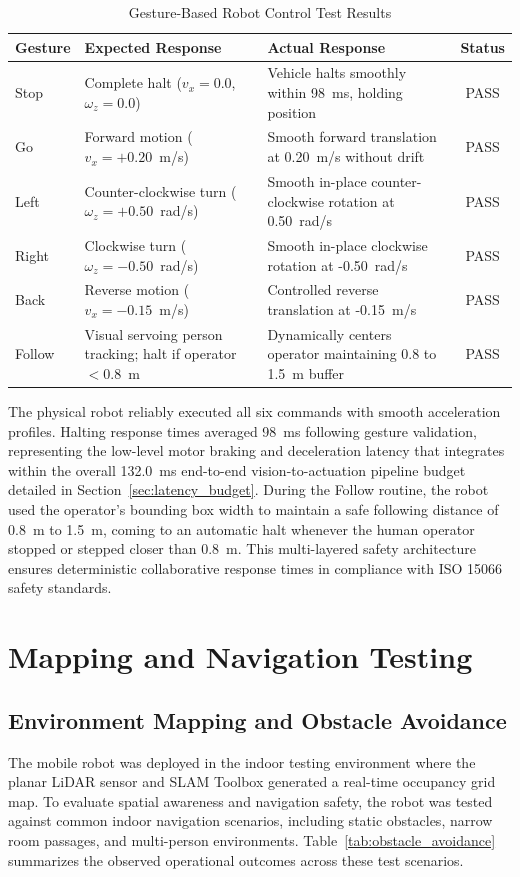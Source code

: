 \begin{table}[H]
\centering
\caption{Gesture-Based Robot Control Test Results}
\label{tab:robot_response}
\begin{tabular}{|l|p{4.2cm}|p{5.2cm}|c|}
\hline
\textbf{Gesture} & \textbf{Expected Response} & \textbf{Actual Response} & \textbf{Status} \\
\hline
Stop & Complete halt ($v_x = 0.0$, $\omega_z = 0.0$) & Vehicle halts smoothly within 98~ms, holding position & PASS \\
\hline
Go & Forward motion ($v_x = +0.20$~m/s) & Smooth forward translation at 0.20~m/s without drift & PASS \\
\hline
Left & Counter-clockwise turn ($\omega_z = +0.50$~rad/s) & Smooth in-place counter-clockwise rotation at 0.50~rad/s & PASS \\
\hline
Right & Clockwise turn ($\omega_z = -0.50$~rad/s) & Smooth in-place clockwise rotation at -0.50~rad/s & PASS \\
\hline
Back & Reverse motion ($v_x = -0.15$~m/s) & Controlled reverse translation at -0.15~m/s & PASS \\
\hline
Follow & Visual servoing person tracking; halt if operator $< 0.8$~m & Dynamically centers operator maintaining 0.8 to 1.5~m buffer & PASS \\
\hline
\end{tabular}
\end{table}

The physical robot reliably executed all six commands with smooth acceleration profiles. Halting response times averaged 98~ms following gesture validation, representing the low-level motor braking and deceleration latency that integrates within the overall 132.0~ms end-to-end vision-to-actuation pipeline budget detailed in Section~\ref{sec:latency_budget}. During the Follow routine, the robot used the operator's bounding box width to maintain a safe following distance of 0.8~m to 1.5~m, coming to an automatic halt whenever the human operator stopped or stepped closer than 0.8~m. This multi-layered safety architecture ensures deterministic collaborative response times in compliance with ISO 15066 safety standards.

\section{Mapping and Navigation Testing}

\subsection{Environment Mapping and Obstacle Avoidance}
The mobile robot was deployed in the indoor testing environment where the planar LiDAR sensor and SLAM Toolbox generated a real-time occupancy grid map. To evaluate spatial awareness and navigation safety, the robot was tested against common indoor navigation scenarios, including static obstacles, narrow room passages, and multi-person environments. Table~\ref{tab:obstacle_avoidance} summarizes the observed operational outcomes across these test scenarios.

